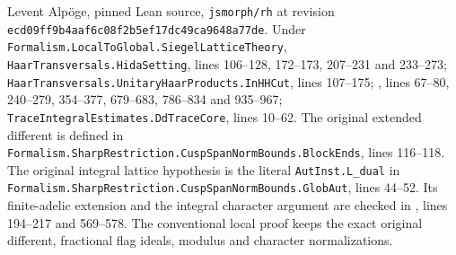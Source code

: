 Levent Alp\"oge, pinned Lean source,
\texttt{jsmorph/rh} at revision
\texttt{ecd09ff9b4aaf6c08f2b5ef17dc49ca9648a77de}.
Under \texttt{Formalism.LocalToGlobal.SiegelLatticeTheory},
\texttt{HaarTransversals.HidaSetting}, lines 106--128, 172--173, 207--231
and 233--273;
\texttt{HaarTransversals.UnitaryHaarProducts.InHHCut}, lines 107--175;
,
lines 67--80, 240--279, 354--377, 679--683, 786--834 and 935--967;
\texttt{TraceIntegralEstimates.DdTraceCore}, lines 10--62.
The original extended different is defined in
\texttt{Formalism.SharpRestriction.CuspSpanNormBounds.BlockEnds},
lines 116--118.
The original integral lattice hypothesis is the literal
\texttt{AutInst.L\_dual} in
\texttt{Formalism.SharpRestriction.CuspSpanNormBounds.GlobAut},
lines 44--52.  Its finite-adelic extension and the integral character
argument are checked in
,
lines 194--217 and 569--578.
The conventional local proof keeps the exact original different,
fractional flag ideals, modulus and character normalizations.
